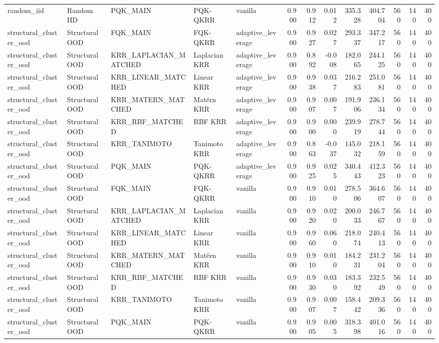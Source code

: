 \begin{tabular}{lllllrrrrrrrr}
random\_iid & Random IID & PQK\_MAIN & PQK-QKRR & vanilla & 0.900 & 0.912 & 0.012 & 335.328 & 404.704 & 560 & 140 & 400 \\
structural\_cluster\_ood & Structural OOD & FQK\_MAIN & FQK-QKRR & adaptive\_leverage & 0.900 & 0.927 & 0.027 & 293.337 & 347.217 & 560 & 140 & 400 \\
structural\_cluster\_ood & Structural OOD & KRR\_LAPLACIAN\_MATCHED & Laplacian KRR & adaptive\_leverage & 0.900 & 0.892 & -0.008 & 182.065 & 244.125 & 560 & 140 & 400 \\
structural\_cluster\_ood & Structural OOD & KRR\_LINEAR\_MATCHED & Linear KRR & adaptive\_leverage & 0.900 & 0.938 & 0.037 & 216.283 & 251.081 & 560 & 140 & 400 \\
structural\_cluster\_ood & Structural OOD & KRR\_MATERN\_MATCHED & Matérn KRR & adaptive\_leverage & 0.900 & 0.907 & 0.007 & 191.906 & 236.134 & 560 & 140 & 400 \\
structural\_cluster\_ood & Structural OOD & KRR\_RBF\_MATCHED & RBF KRR & adaptive\_leverage & 0.900 & 0.900 & 0.000 & 239.919 & 278.744 & 560 & 140 & 400 \\
structural\_cluster\_ood & Structural OOD & KRR\_TANIMOTO & Tanimoto KRR & adaptive\_leverage & 0.900 & 0.863 & -0.037 & 145.032 & 218.159 & 560 & 140 & 400 \\
structural\_cluster\_ood & Structural OOD & PQK\_MAIN & PQK-QKRR & adaptive\_leverage & 0.900 & 0.925 & 0.025 & 340.443 & 412.323 & 560 & 140 & 400 \\
structural\_cluster\_ood & Structural OOD & FQK\_MAIN & FQK-QKRR & vanilla & 0.900 & 0.910 & 0.010 & 278.506 & 364.607 & 560 & 140 & 400 \\
structural\_cluster\_ood & Structural OOD & KRR\_LAPLACIAN\_MATCHED & Laplacian KRR & vanilla & 0.900 & 0.920 & 0.020 & 200.033 & 246.767 & 560 & 140 & 400 \\
structural\_cluster\_ood & Structural OOD & KRR\_LINEAR\_MATCHED & Linear KRR & vanilla & 0.900 & 0.960 & 0.060 & 218.074 & 240.413 & 560 & 140 & 400 \\
structural\_cluster\_ood & Structural OOD & KRR\_MATERN\_MATCHED & Matérn KRR & vanilla & 0.900 & 0.910 & 0.010 & 184.231 & 231.204 & 560 & 140 & 400 \\
structural\_cluster\_ood & Structural OOD & KRR\_RBF\_MATCHED & RBF KRR & vanilla & 0.900 & 0.930 & 0.030 & 183.392 & 232.549 & 560 & 140 & 400 \\
structural\_cluster\_ood & Structural OOD & KRR\_TANIMOTO & Tanimoto KRR & vanilla & 0.900 & 0.907 & 0.007 & 158.442 & 209.336 & 560 & 140 & 400 \\
structural\_cluster\_ood & Structural OOD & PQK\_MAIN & PQK-QKRR & vanilla & 0.900 & 0.905 & 0.005 & 318.398 & 401.016 & 560 & 140 & 400 \\
\bottomrule
\end{tabular}
